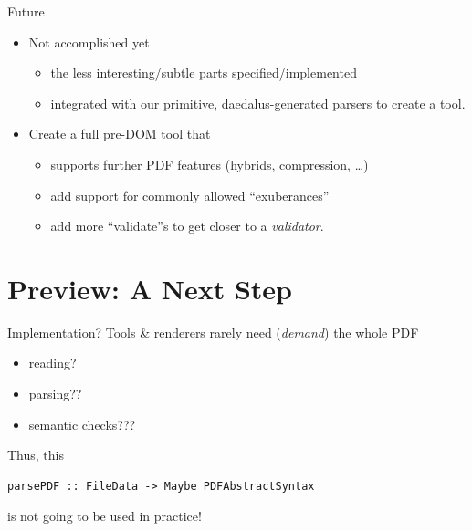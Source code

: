 \documentclass[t,10pt,xcolor={dvipsnames}]{beamer}
\begin{document}
\begin{frame}[label={sec:org380bc9e}]{Future}
\begin{itemize}
\item Not accomplished yet
\begin{itemize}
\item the less interesting/subtle parts specified/implemented
\item integrated with our primitive, daedalus-generated parsers to create
a  tool.
\end{itemize}

\item Create a full pre-DOM tool that
\begin{itemize}
\item supports further PDF features (hybrids, compression, …)
\item add support for commonly allowed “exuberances”
\item add more “validate”s to get closer to a \emph{validator}.
\end{itemize}
\end{itemize}
\end{frame}

\section{Preview: A Next Step}
\label{sec:org9c5f297}
\begin{frame}[label={sec:orgeb14077},fragile]{Implementation?}
 Tools \& renderers rarely need (\emph{demand}) the whole PDF
\begin{itemize}
\item reading?
\item parsing??
\item semantic checks???
\end{itemize}
\vspace{12pt}

Thus, this
\lstset{language=haskell,label= ,caption= ,captionpos=b,numbers=none}
\begin{lstlisting}
parsePDF :: FileData -> Maybe PDFAbstractSyntax
\end{lstlisting}
is not going to be used in practice!     
\end{frame}
\end{document}
